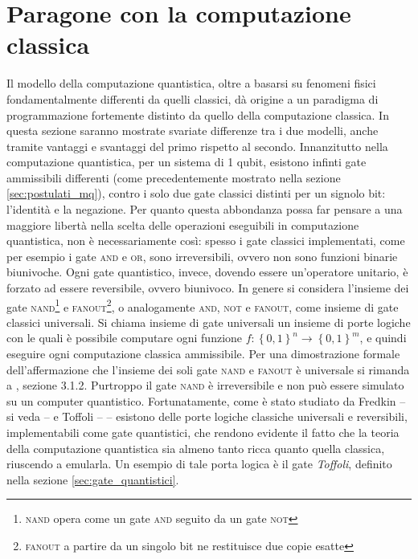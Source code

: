 \section{Paragone con la computazione classica}\label{sec:paragone_cc}
Il modello della computazione quantistica, oltre a basarsi su fenomeni fisici fondamentalmente differenti da quelli classici, dà origine a un paradigma di programmazione fortemente distinto da quello della computazione classica.
In questa sezione saranno mostrate svariate differenze tra i due modelli, anche tramite vantaggi e svantaggi del primo rispetto al secondo.
Innanzitutto nella computazione quantistica, per un sistema di 1 qubit, esistono infinti gate ammissibili differenti (come precedentemente mostrato nella sezione \ref{sec:postulati_mq}), contro i solo due gate classici distinti per un signolo bit: l'identità e la negazione.
Per quanto questa abbondanza possa far pensare a una maggiore libertà nella scelta delle operazioni eseguibili in computazione quantistica, non è necessariamente così: spesso i gate classici implementati, come per esempio i gate \textsc{and} e \textsc{or}, sono irreversibili, ovvero non sono funzioni binarie biunivoche.
Ogni gate quantistico, invece, dovendo essere un'operatore unitario, è forzato ad essere reversibile, ovvero biunivoco. 
In genere si considera l'insieme dei gate \textsc{nand}\footnote{\textsc{nand} opera come un gate \textsc{and} seguito da un gate \textsc{not}} e \textsc{fanout}\footnote{\textsc{fanout} a partire da un singolo bit ne restituisce due copie esatte}, o analogamente \textsc{and}, \textsc{not} e \textsc{fanout}, come insieme di gate classici universali.
Si chiama insieme di gate universali un insieme di porte logiche con le quali è possibile computare ogni funzione $f: \left\{0,1\right\}^n \to \left\{0,1\right\}^m$, e quindi eseguire ogni computazione classica ammissibile.
Per una dimostrazione formale dell'affermazione che l'insieme dei soli gate \textsc{nand} e \textsc{fanout} è universale si rimanda a \cite{Book:QCQI}, sezione 3.1.2.
Purtroppo il gate \textsc{nand} è irreversibile e non può essere simulato su un computer quantistico.
Fortunatamente, come è stato studiato da Fredkin -- si veda \cite{Article:FTCL} -- e Toffoli -- \cite{Article:TRC} -- esistono delle porte logiche classiche universali e reversibili, implementabili come gate quantistici, che rendono evidente il fatto che la teoria della computazione quantistica sia almeno tanto ricca quanto quella classica, riuscendo a emularla. 
Un esempio di tale porta logica è il gate \textit{Toffoli}, definito nella sezione \ref{sec:gate_quantistici}.
